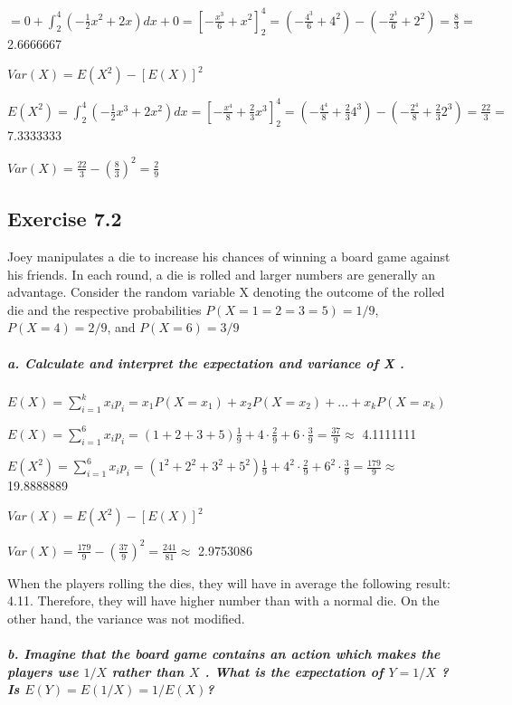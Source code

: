 \documentclass[
]{article}
\begin{document}
\(\displaystyle{=0 + \int_2^4 (-\frac{1}{2}x^2 + 2x) dx + 0 = \left[ - \frac{x^3}{6} + x^2 \right]^4_2 = (-\frac{4^3}{6} + 4^2) - (-\frac{2^3}{6} + 2^2)} = \frac{8}{3}=\)
2.6666667

\(\displaystyle{Var(X) = E(X^2) - [E(X)]^2}\)

\(\displaystyle{E(X^2) = \int_2^4 (-\frac{1}{2}x^3 + 2x^2) dx = \left[ -\frac{x^4}{8} + \frac{2}{3}x^3 \right]_2^4 = (-\frac{4^4}{8} +\frac{2}{3}4^3)- (- \frac{2^4}{8} + \frac{2}{3}2^3) =\frac{22}{3} =}\)
7.3333333

\(Var(X) = \frac{22}{3} - (\frac{8}{3})^2 =\frac{2}{9}\)

\hypertarget{exercise-7.2}{%
\subsection{Exercise 7.2}\label{exercise-7.2}}

Joey manipulates a die to increase his chances of winning a board game
against his friends. In each round, a die is rolled and larger numbers
are generally an advantage. Consider the random variable X denoting the
outcome of the rolled die and the respective probabilities
\(P(X = 1 = 2 = 3 = 5) = 1/9\), \(P(X = 4) = 2/9\), and
\(P(X = 6) = 3/9\)

\hypertarget{a.-calculate-and-interpret-the-expectation-and-variance-of-x-.}{%
\subparagraph{a. Calculate and interpret the expectation and variance of
X
.}\label{a.-calculate-and-interpret-the-expectation-and-variance-of-x-.}}

\(E(X)=\sum\limits_{i=1}^kx_ip_i=x_1P(X=x_1)+x_2P(X=x_2)+ ... + x_kP(X=x_k)\)

\(E(X) = \sum\limits_{i=1}^6x_ip_i = (1 + 2 + 3 +5)\frac{1}{9} + 4 \cdot \frac{2}{9} + 6 \cdot \frac{3}{9} = \frac{37}{9} \approx\)
4.1111111

\(E(X^2) = \sum\limits_{i=1}^6x_ip_i = (1^2 + 2^2 + 3^2 +5^2)\frac{1}{9} + 4^2 \cdot \frac{2}{9} + 6^2 \cdot \frac{3}{9} = \frac{179}{9} \approx\)
19.8888889

\(\displaystyle{Var(X) = E(X^2) - [E(X)]^2}\)

\(Var(X) = \frac{179}{9} - (\frac{37}{9})^2 = \frac{241}{81} \approx\)
2.9753086

When the players rolling the dies, they will have in average the
following result: 4.11. Therefore, they will have higher number than
with a normal die. On the other hand, the variance was not modified.

\hypertarget{b.-imagine-that-the-board-game-contains-an-action-which-makes-the-players-use-1x-rather-than-x-.-what-is-the-expectation-of-y-1x-is-ey-e1-x-1ex}{%
\subparagraph{\texorpdfstring{b. Imagine that the board game contains an
action which makes the players use \(1/X\) rather than \(X\) . What is
the expectation of \(Y = 1/X\) ? Is
\(E(Y ) = E(1/ X ) = 1/E(X)\)?}{b. Imagine that the board game contains an action which makes the players use 1/X rather than X . What is the expectation of Y = 1/X ? Is E(Y ) = E(1/ X ) = 1/E(X)?}}\label{b.-imagine-that-the-board-game-contains-an-action-which-makes-the-players-use-1x-rather-than-x-.-what-is-the-expectation-of-y-1x-is-ey-e1-x-1ex}}
\end{document}
